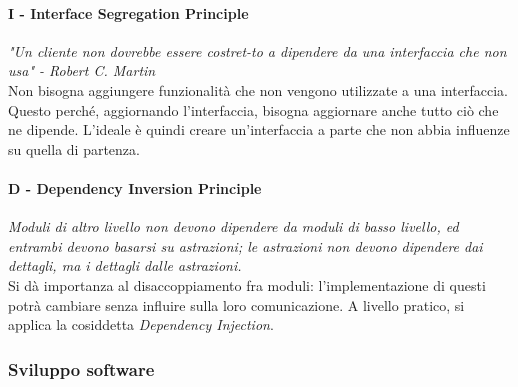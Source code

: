 \documentclass{article}
\begin{document}
            \paragraph{I - Interface Segregation Principle}
                \textit{"Un cliente non dovrebbe essere costret-to a dipendere da una interfaccia che non usa" - Robert C. Martin}\\
                Non bisogna aggiungere funzionalità che non vengono utilizzate a una interfaccia. Questo perché, aggiornando l'interfaccia, bisogna aggiornare anche tutto ciò che ne dipende. L'ideale è quindi creare un'interfaccia a parte che non abbia influenze su quella di partenza.
            \paragraph{D - Dependency Inversion Principle} 
                \textit{Moduli di altro livello non devono dipendere da moduli di basso livello, ed entrambi devono basarsi su astrazioni; le astrazioni non devono dipendere dai dettagli, ma i dettagli dalle astrazioni.}\\
                Si dà importanza al disaccoppiamento fra moduli: l'implementazione di questi potrà cambiare senza influire sulla loro comunicazione. A livello pratico, si applica la cosiddetta \textit{Dependency Injection}.
        \subsubsection{Sviluppo software}
\end{document}
